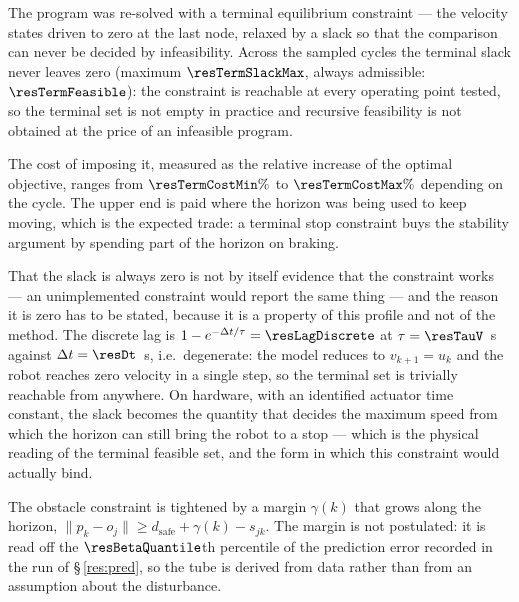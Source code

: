 The program was re-solved with a terminal equilibrium constraint --- the velocity states driven to zero at the last node, relaxed by a slack so that the comparison can never be decided by infeasibility. Across the sampled cycles the terminal slack never leaves zero (maximum $\resTermSlackMax$, always admissible: $\resTermFeasible$): the constraint is reachable at every operating point tested, so the terminal set is not empty in practice and recursive feasibility is not obtained at the price of an infeasible program.

The cost of imposing it, measured as the relative increase of the optimal objective, ranges from $\resTermCostMin\%$ to $\resTermCostMax\%$ depending on the cycle. The upper end is paid where the horizon was being used to keep moving, which is the expected trade: a terminal stop constraint buys the stability argument by spending part of the horizon on braking.

That the slack is always zero is not by itself evidence that the constraint works --- an unimplemented constraint would report the same thing --- and the reason it is zero has to be stated, because it is a property of this profile and not of the method. The discrete lag is $1-e^{-\Delta t/\tau}=\resLagDiscrete$ at $\tau=\resTauV$~s against $\Delta t=\resDt$~s, i.e.\ degenerate: the model reduces to $v_{k+1}=u_k$ and the robot reaches zero velocity in a single step, so the terminal set is trivially reachable from anywhere. On hardware, with an identified actuator time constant, the slack becomes the quantity that decides the maximum speed from which the horizon can still bring the robot to a stop --- which is the physical reading of the terminal feasible set, and the form in which this constraint would actually bind.

\label{res:robust}


The obstacle constraint is tightened by a margin $\gamma(k)$ that grows along the horizon, $\lVert p_k-o_j\rVert \ge d_{\mathrm{safe}}+\gamma(k)-s_{jk}$. The margin is not postulated: it is read off the $\resBetaQuantile$th percentile of the prediction error recorded in the run of \S\,\ref{res:pred}, so the tube is derived from data rather than from an assumption about the disturbance.

